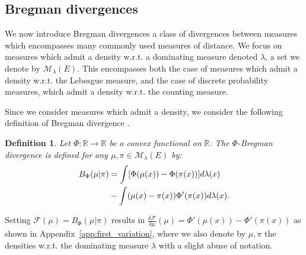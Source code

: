 \documentclass{article}
\newcommand{\cM}{\mathcal M}
\newcommand{\cF}{\mathcal F}
\newcommand{\R}{\mathbb R}
\newcommand{\X}{E}
\newcommand{\ssp}[1]{\langle #1 \rangle}
\newtheorem{definition}{Definition}
\begin{document}
\subsection{Bregman divergences}
We now introduce Bregman divergences \citep{BREGMAN1967200} a class of divergences between measures which encompasses many commonly used measures of distance. 
We focus on measures which admit a density w.r.t. a dominating measure denoted $\lambda$, a set we denote by $\cM_{\lambda}(\X)$. This encompasses both the case of measures which admit a density w.r.t. the Lebesgue measure, and the case of discrete probability measures, which admit a density w.r.t. the counting measure.

Since we consider measures which admit a density, we consider the following definition of Bregman divergence \citep{cichocki2010families}.

\begin{definition}
Let $\Phi:\R\to \R$ be a convex functional on $\R$. The $\Phi$-Bregman divergence is defined for any $\mu, \pi \in \cM_\lambda(\X)$ by:
\begin{align}
\label{eq:breg_probas}
     B_{\Phi}(\mu|\pi)&=\int [\Phi(\mu(x))-\Phi(\pi(x))]d\lambda(x)\\
    &-\int (\mu(x)-\pi(x))\Phi'(\pi(x))d\lambda(x).\notag
\end{align}
\end{definition}


Setting $\cF(\mu) = B_{\Phi}(\mu|\pi)$ results in $\frac{\delta \cF}{\delta \mu}(\mu)= \Phi'(\mu(x)) - \Phi'(\pi(x))$ as shown in Appendix~\ref{app:first_variation}, where we also denote by $\mu, \pi$ the densities w.r.t. the dominating measure $\lambda$ with a slight abuse of notation.
\end{document}
